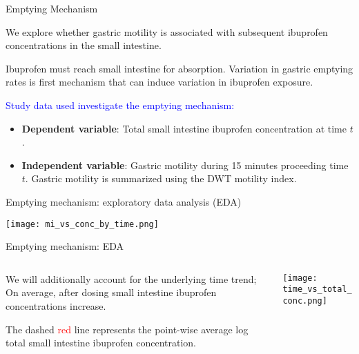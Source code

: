 \documentclass[handout]{beamer}
\begin{document}
\begin{frame}[c]{Emptying Mechanism}

We explore whether gastric motility is associated with subsequent ibuprofen concentrations in the small intestine.

\bigskip

Ibuprofen must reach small intestine for absorption. Variation in gastric emptying rates is first mechanism that can induce variation in ibuprofen exposure.

\bigskip

\textcolor{blue}{Study data used investigate the emptying mechanism:}
\begin{itemize}
	\item {\bf Dependent variable}: Total small intestine  ibuprofen concentration at time $t$.
	\item {\bf Independent variable}: Gastric motility during 15 minutes proceeding time $t$. Gastric motility is summarized using the DWT motility index.
\end{itemize}

\end{frame}

\begin{frame}[c]{Emptying mechanism: exploratory data analysis (EDA)}

\texttt{[image: mi\_vs\_conc\_by\_time.png]}

\end{frame}


\begin{frame}[c]{Emptying mechanism: EDA }
\begin{columns}
\begin{column}{.4\textwidth}

We will additionally account for the underlying time trend; On average, after dosing small intestine ibuprofen concentrations increase.

\bigskip

The dashed \textcolor{red}{red} line represents the point-wise average log total small intestine ibuprofen concentration.
\end{column}
\begin{column}{.6\textwidth}
\texttt{[image: time\_vs\_total\_conc.png]}
\end{column}
\end{columns}
\end{frame}
\end{document}
